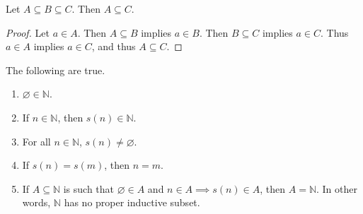 \documentclass{article}
\begin{document}
\begin{lemma}\label{lma:16}
	Let $A\subseteq B \subseteq C$. Then $A\subseteq C$.
\end{lemma}
\begin{proof}
	Let $a\in A$. Then $A\subseteq B$ implies $a\in B$. Then $B\subseteq C$ implies $a\in C$. Thus $a\in A$ implies $a\in C$, and thus $A\subseteq C$.
\end{proof}



\begin{theorem}\label{thm:peano}
	The following are true.
	\begin{enumerate}
		\item $\varnothing \in \mathbb{N} $.
		\item If $n\in\mathbb{N} $, then $s(n)\in\mathbb{N} $.
		\item For all $n\in\mathbb{N} $, $s(n) \neq \varnothing$.
		\item If $s(n)=s(m)$, then $n=m$.
		\item If $A\subseteq \mathbb{N} $ is such that $\varnothing \in A$ and $n\in A \implies s(n)\in A$, then $A=\mathbb{N} $. In other words, $\mathbb{N} $ has no proper inductive subset.
	\end{enumerate}
\end{theorem}
\end{document}
